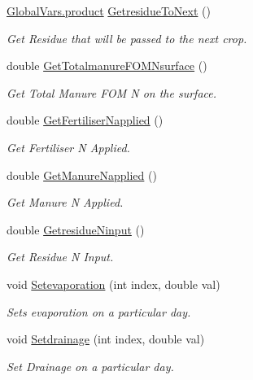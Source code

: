 \begin{DoxyCompactItemize}
\mbox{\hyperlink{class_global_vars_1_1product}{Global\+Vars.\+product}} \mbox{\hyperlink{class_crop_class_a7c8d225daf6bd0104cea280993403ec7}{Getresidue\+To\+Next}} ()
\begin{DoxyCompactList}\small\item\em Get Residue that will be passed to the next crop. \end{DoxyCompactList}\item 
double \mbox{\hyperlink{class_crop_class_a7c2f742609fe3425409395df0f8ea450}{Get\+Totalmanure\+F\+O\+M\+Nsurface}} ()
\begin{DoxyCompactList}\small\item\em Get Total Manure F\+OM N on the surface. \end{DoxyCompactList}\item 
double \mbox{\hyperlink{class_crop_class_abe4a417408aeebaa65788c105f86d735}{Get\+Fertiliser\+Napplied}} ()
\begin{DoxyCompactList}\small\item\em Get Fertiliser N Applied. \end{DoxyCompactList}\item 
double \mbox{\hyperlink{class_crop_class_a6e0998fc257ff97443ea945226a12f89}{Get\+Manure\+Napplied}} ()
\begin{DoxyCompactList}\small\item\em Get Manure N Applied. \end{DoxyCompactList}\item 
double \mbox{\hyperlink{class_crop_class_a30f491fdf15f7729bb8497b703c43be2}{Getresidue\+Ninput}} ()
\begin{DoxyCompactList}\small\item\em Get Residue N Input. \end{DoxyCompactList}\item 
void \mbox{\hyperlink{class_crop_class_a055c699749ec88e2eb2b5f1a1ebd79c5}{Setevaporation}} (int index, double val)
\begin{DoxyCompactList}\small\item\em Sets evaporation on a particular day. \end{DoxyCompactList}\item 
void \mbox{\hyperlink{class_crop_class_a1d24f0afc61cad2c1f462a0cafccfe64}{Setdrainage}} (int index, double val)
\begin{DoxyCompactList}\small\item\em Set Drainage on a particular day. \end{DoxyCompactList}\item 

\end{DoxyCompactItemize}
